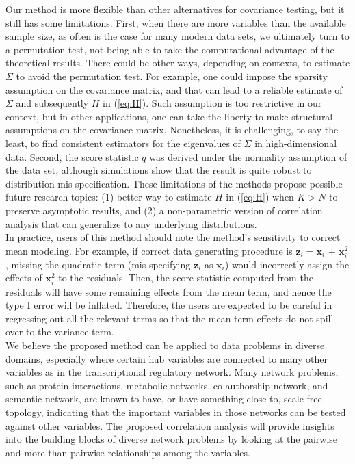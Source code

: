 \documentclass[aap,authoryear, preprint]{imsart}
\numberwithin{equation}{section}
\theoremstyle{plain}
\begin{document}
Our method is more flexible than other alternatives for covariance testing, but it still has some limitations. First, when there are more variables than the available sample size, as often is the case for many modern data sets, we ultimately turn to a permutation test, not being able to take the computational advantage of the theoretical results. There could be other ways, depending on contexts, to estimate $\Sigma$ to avoid the permutation test. For example, one could impose the sparsity assumption on the covariance matrix, and that can lead to a reliable estimate of $\Sigma$ and subsequently $H$ in (\ref{eq:H}). Such assumption is too restrictive in our context, but in other applications, one can take the liberty to make structural assumptions on the covariance matrix. Nonetheless, it is challenging, to say the least, to find consistent estimators for the eigenvalues of $\Sigma$ in high-dimensional data. Second, the score statistic $q$ was derived under the normality assumption of the data set, although simulations show that the result is quite robust to distribution mis-specification. These limitations of the methods propose possible future research topics: (1) better way to estimate $H$ in (\ref{eq:H}) when $K > N$ to preserve asymptotic results, and (2) a non-parametric version of correlation analysis that can generalize to any underlying distributions. \\

In practice, users of this method should note the method's sensitivity to correct mean modeling. For example, if correct data generating procedure is $\bm{z}_i = \bm{x}_i$ + $\bm{x}_i^2$, missing the quadratic term (mis-specifying $\bm{z}_i$ as $\bm{x}_i$) would incorrectly assign the effects of $\bm{x}_i^2$ to the residuals. Then, the score statistic computed from the residuals will have some remaining effects from the mean term, and hence the type I error will be inflated. Therefore, the users are expected to be careful in regressing out all the relevant terms so that the mean term effects do not spill over to the variance term.\\ 

We believe the proposed method can be applied to data problems in diverse domains, especially where certain hub variables are connected to many other variables as in the transcriptional regulatory network. Many network problems, such as protein interactions, metabolic networks, co-authorship network, and semantic network, are known to have, or have something close to, scale-free topology, indicating that the important variables in those networks can be tested against other variables. The proposed correlation analysis will provide insights into the building blocks of diverse network problems by looking at the pairwise and more than pairwise relationships among the variables.
\end{document}
